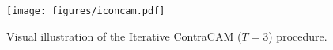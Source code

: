 \begin{figure}[t]
\centering
\texttt{[image: figures/iconcam.pdf]}
\caption{
Visual illustration of the Iterative ContraCAM ($T=3$) procedure.
}\label{fig:method-iconcam}
\end{figure}
